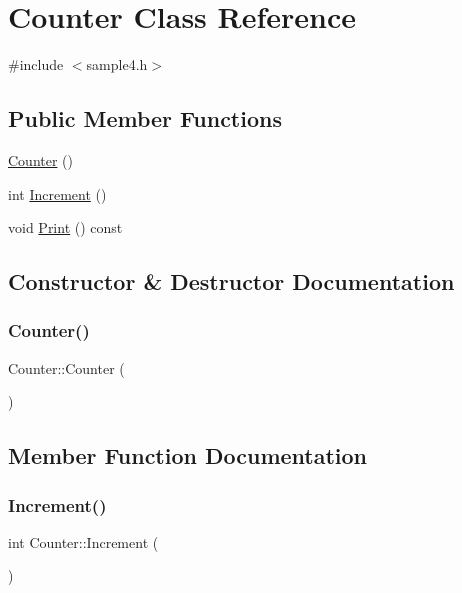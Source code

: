 \hypertarget{class_counter}{}\section{Counter Class Reference}
\label{class_counter}


{\ttfamily \#include $<$sample4.\+h$>$}

\subsection*{Public Member Functions}
\begin{DoxyCompactItemize}
\item 
\hyperlink{class_counter_a1e05f69b5240fbab3e7ab351672167f0}{Counter} ()
\item 
int \hyperlink{class_counter_a0a0ca9fdb580a2aec9a5a62ebed2b5ab}{Increment} ()
\item 
void \hyperlink{class_counter_a80092ec2a0deea0870b2e9f8ad0906bd}{Print} () const
\end{DoxyCompactItemize}


\subsection{Constructor \& Destructor Documentation}
\mbox{\label{class_counter_a1e05f69b5240fbab3e7ab351672167f0}} 
\subsubsection{\texorpdfstring{Counter()}{Counter()}}
{\footnotesize\ttfamily Counter\+::\+Counter (\begin{DoxyParamCaption}{ }\end{DoxyParamCaption})\hspace{0.3cm}{\ttfamily [inline]}}



\subsection{Member Function Documentation}
\mbox{\label{class_counter_a0a0ca9fdb580a2aec9a5a62ebed2b5ab}} 
\subsubsection{\texorpdfstring{Increment()}{Increment()}}
{\footnotesize\ttfamily int Counter\+::\+Increment (\begin{DoxyParamCaption}{ }\end{DoxyParamCaption})}


